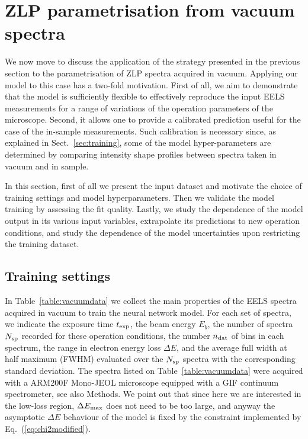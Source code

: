 \section{ZLP parametrisation from vacuum spectra}
\label{sec:results_vacuum}

We now move to discuss the application of the strategy presented in the previous
section to the parametrisation of ZLP spectra acquired in vacuum.
%
Applying our model to this case has a two-fold motivation.
%
First of all, we aim to demonstrate that the model is sufficiently flexible
to effectively reproduce the
input EELS measurements for a range of variations of the operation parameters of the microscope.
%
Second, it allows one to provide a calibrated prediction
useful for the case of the in-sample measurements.
%
Such calibration is necessary since, as explained in Sect.~\ref{sec:training}, some of the model
hyper-parameters are determined by comparing intensity shape profiles
between spectra taken in vacuum and in sample.

In this section, first of all we present the input dataset and motivate the choice
of training settings and model hyperparameters.
%
Then we validate the model training by assessing the fit quality.
%
Lastly, we study the dependence of the model output in its various input
variables, extrapolate  its predictions to new operation
conditions, and study the dependence of the model uncertainties upon
restricting the training dataset.

\subsection{Training settings}

In Table~\ref{table:vacuumdata} we collect the main properties of the EELS spectra
acquired in vacuum to train the neural
network model.  For each set of spectra, we indicate the exposure time $t_{\rm exp}$, the beam energy
$E_b$, the number of spectra $N_{\rm sp}$ recorded for these operation conditions, the number $n_{\rm dat}$ of
bins in each spectrum, the range in electron energy loss $\Delta E$,
and the average full width at half maximum (FWHM)
evaluated over the $N_{\rm sp}$ spectra with the corresponding standard deviation.
%
The spectra  listed on Table~\ref{table:vacuumdata}
were acquired with a ARM200F Mono-JEOL microscope equipped
with a GIF continuum spectrometer, see also Methods.
%
We point out that since here
we are interested in the low-loss region, $\Delta E_{\rm max}$ does not need
to be too large, and anyway the asymptotic $\Delta E$ behaviour of the model is fixed
by the constraint implemented by Eq.~(\ref{eq:chi2modified}).

